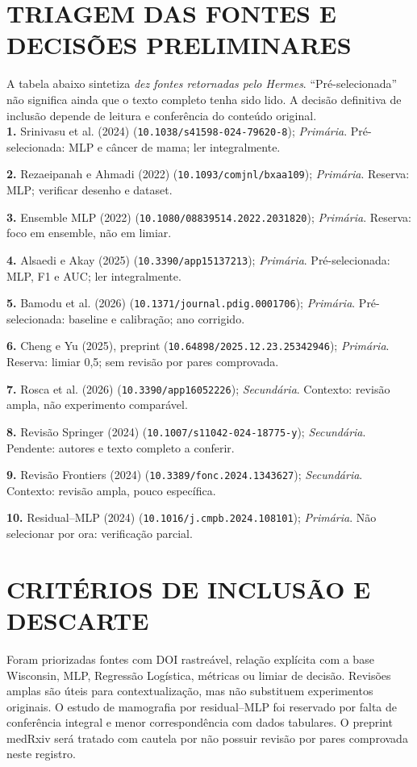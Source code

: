 \documentclass[article,12pt,oneside,a4paper,english,brazil,sumario=tradicional]{abntex2}
\begin{document}
\section{TRIAGEM DAS FONTES E DECISÕES PRELIMINARES}
\noindent A tabela abaixo sintetiza \textit{dez fontes retornadas pelo Hermes}. ``Pré-selecionada'' não significa ainda que o texto completo tenha sido lido. A decisão definitiva de inclusão depende de leitura e conferência do conteúdo original.\\[5pt]
\textbf{1.} Srinivasu et al. (2024) (\texttt{10.1038/s41598-024-79620-8}); \textit{Primária}. Pré-selecionada: MLP e câncer de mama; ler integralmente.\par
\textbf{2.} Rezaeipanah e Ahmadi (2022) (\texttt{10.1093/comjnl/bxaa109}); \textit{Primária}. Reserva: MLP; verificar desenho e dataset.\par
\textbf{3.} Ensemble MLP (2022) (\texttt{10.1080/08839514.2022.2031820}); \textit{Primária}. Reserva: foco em ensemble, não em limiar.\par
\textbf{4.} Alsaedi e Akay (2025) (\texttt{10.3390/app15137213}); \textit{Primária}. Pré-selecionada: MLP, F1 e AUC; ler integralmente.\par
\textbf{5.} Bamodu et al. (2026) (\texttt{10.1371/journal.pdig.0001706}); \textit{Primária}. Pré-selecionada: baseline e calibração; ano corrigido.\par
\textbf{6.} Cheng e Yu (2025), preprint (\texttt{10.64898/2025.12.23.25342946}); \textit{Primária}. Reserva: limiar 0,5; sem revisão por pares comprovada.\par
\textbf{7.} Rosca et al. (2026) (\texttt{10.3390/app16052226}); \textit{Secundária}. Contexto: revisão ampla, não experimento comparável.\par
\textbf{8.} Revisão Springer (2024) (\texttt{10.1007/s11042-024-18775-y}); \textit{Secundária}. Pendente: autores e texto completo a conferir.\par
\textbf{9.} Revisão Frontiers (2024) (\texttt{10.3389/fonc.2024.1343627}); \textit{Secundária}. Contexto: revisão ampla, pouco específica.\par
\textbf{10.} Residual--MLP (2024) (\texttt{10.1016/j.cmpb.2024.108101}); \textit{Primária}. Não selecionar por ora: verificação parcial.\par
\section{CRITÉRIOS DE INCLUSÃO E DESCARTE}
Foram priorizadas fontes com DOI rastreável, relação explícita com a base Wisconsin, MLP, Regressão Logística, métricas ou limiar de decisão. Revisões amplas são úteis para contextualização, mas não substituem experimentos originais. O estudo de mamografia por residual--MLP foi reservado por falta de conferência integral e menor correspondência com dados tabulares. O preprint medRxiv será tratado com cautela por não possuir revisão por pares comprovada neste registro.
\end{document}
